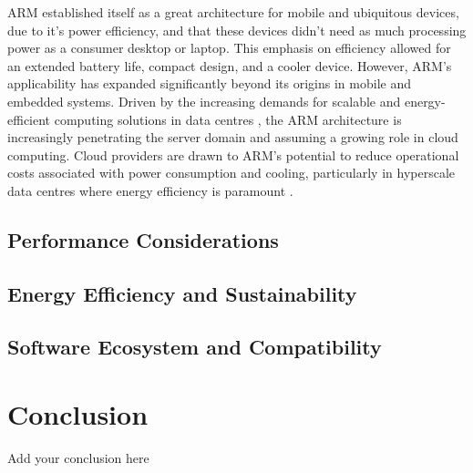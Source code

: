 \documentclass[conference]{IEEEtran}  %
\begin{document}
ARM established itself as a great architecture for mobile and ubiquitous devices, due to it's power efficiency, and that these devices didn't need as much processing power as a consumer desktop or laptop.
This emphasis on efficiency allowed for an extended battery life, compact design, and a cooler device. \cite{furber1988advantages}
However, ARM's applicability has expanded significantly beyond its origins in mobile and embedded systems. Driven by the increasing demands for scalable and energy-efficient computing solutions in data centres \cite{ARM_to_server}, the ARM architecture is increasingly penetrating the server domain and assuming a growing role in cloud computing. Cloud providers are drawn to ARM's potential to reduce operational costs associated with power consumption and cooling, particularly in hyperscale data centres where energy efficiency is paramount \cite{datacentre_energy}. 

\subsection{Performance Considerations}
\subsection{Energy Efficiency and Sustainability}
\subsection{Software Ecosystem and Compatibility}


\section{Conclusion} %
Add your conclusion here


\end{document}
